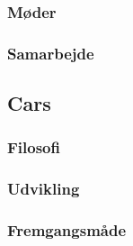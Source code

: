 \begin{frame}
\frametitle{Møder}

\end{frame}

\begin{frame}
\frametitle{Samarbejde}

\end{frame}

\subsection{Cars}

\begin{frame}
\frametitle{Filosofi}

\end{frame}

\begin{frame}
\frametitle{Udvikling}

\end{frame}

\begin{frame}
\frametitle{Fremgangsmåde}

\end{frame}